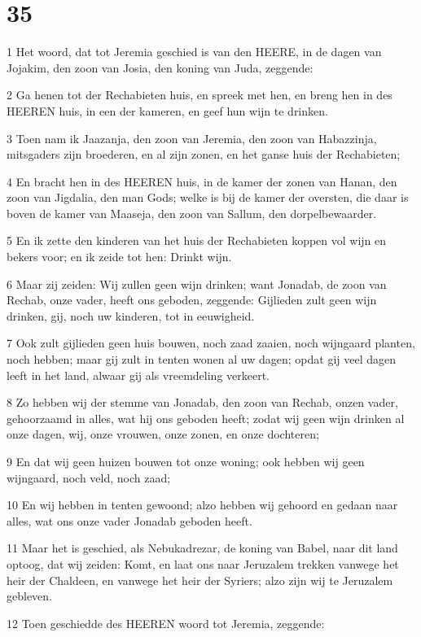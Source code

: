 \chapter{35}

\par 1 Het woord, dat tot Jeremia geschied is van den HEERE, in de dagen van Jojakim, den zoon van Josia, den koning van Juda, zeggende:
\par 2 Ga henen tot der Rechabieten huis, en spreek met hen, en breng hen in des HEEREN huis, in een der kameren, en geef hun wijn te drinken.
\par 3 Toen nam ik Jaazanja, den zoon van Jeremia, den zoon van Habazzinja, mitsgaders zijn broederen, en al zijn zonen, en het ganse huis der Rechabieten;
\par 4 En bracht hen in des HEEREN huis, in de kamer der zonen van Hanan, den zoon van Jigdalia, den man Gods; welke is bij de kamer der oversten, die daar is boven de kamer van Maaseja, den zoon van Sallum, den dorpelbewaarder.
\par 5 En ik zette den kinderen van het huis der Rechabieten koppen vol wijn en bekers voor; en ik zeide tot hen: Drinkt wijn.
\par 6 Maar zij zeiden: Wij zullen geen wijn drinken; want Jonadab, de zoon van Rechab, onze vader, heeft ons geboden, zeggende: Gijlieden zult geen wijn drinken, gij, noch uw kinderen, tot in eeuwigheid.
\par 7 Ook zult gijlieden geen huis bouwen, noch zaad zaaien, noch wijngaard planten, noch hebben; maar gij zult in tenten wonen al uw dagen; opdat gij veel dagen leeft in het land, alwaar gij als vreemdeling verkeert.
\par 8 Zo hebben wij der stemme van Jonadab, den zoon van Rechab, onzen vader, gehoorzaamd in alles, wat hij ons geboden heeft; zodat wij geen wijn drinken al onze dagen, wij, onze vrouwen, onze zonen, en onze dochteren;
\par 9 En dat wij geen huizen bouwen tot onze woning; ook hebben wij geen wijngaard, noch veld, noch zaad;
\par 10 En wij hebben in tenten gewoond; alzo hebben wij gehoord en gedaan naar alles, wat ons onze vader Jonadab geboden heeft.
\par 11 Maar het is geschied, als Nebukadrezar, de koning van Babel, naar dit land optoog, dat wij zeiden: Komt, en laat ons naar Jeruzalem trekken vanwege het heir der Chaldeen, en vanwege het heir der Syriers; alzo zijn wij te Jeruzalem gebleven.
\par 12 Toen geschiedde des HEEREN woord tot Jeremia, zeggende:
